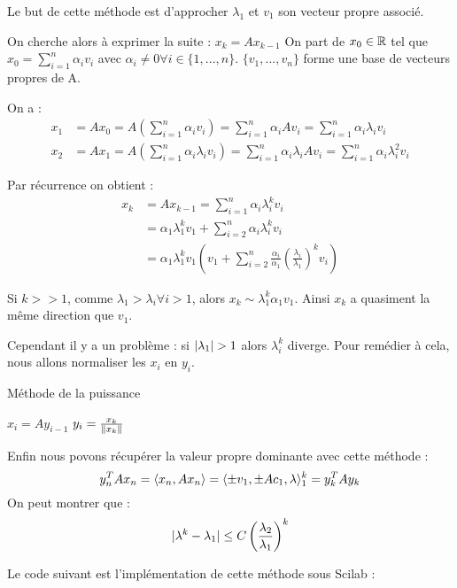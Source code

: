 	Le but de cette méthode est d'approcher $\lambda_1$ et $v_1$ son vecteur propre associé.

	On cherche alors à exprimer la suite : $x_k = Ax_{k-1}$ 
	On part de $x_0 \in \mathbb{R}$ tel que $x_0 = \sum_{i=1}^n \alpha_i v_i$ avec $\alpha_i \neq 0 \forall i \in \{1,...,n\}$. $\{v_1, ..., v_n\}$ forme une base de vecteurs propres de A.

	On a :
	\begin{align*}	
		x_1 &= Ax_0 = A \left( \sum_{i=1}^n \alpha_i v_i \right) = \sum_{i=1}^n \alpha_i Av_i = \sum_{i=1}^n \alpha_i \lambda_i v_i		\\
		x_2 &= Ax_1 = A \left( \sum_{i=1}^n \alpha_i \lambda_i v_i \right) = \sum_{i=1}^n \alpha_i \lambda_i Av_i = \sum_{i=1}^n \alpha_i \lambda_i^2 v_i
	\end{align*}
	
	Par récurrence on obtient :
	\begin{align*}
		x_k &= Ax_{k-1} = \sum_{i=1}^n \alpha_i \lambda_i^k v_i		\\
			&= \alpha_1 \lambda_1^k v_1 + \sum_{i=2}^n \alpha_i \lambda_i^k v_i	\\
			&= \alpha_1 \lambda_1^k v_1 \left( v_1 + \sum_{i=2}^n \frac{\alpha_i}{\alpha_1} \left( \frac{\lambda_i}{\lambda_1} \right)^k v_i  \right)
	\end{align*}

	Si $k>>1$, comme $\lambda_1 > \lambda_i \forall i >1$, alors $x_k \sim \lambda_1^k \alpha_1 v_1$. Ainsi $x_k$ a quasiment la même direction que $v_1$.

	Cependant il y a un problème : si $\lvert \lambda_1 \rvert>1$ alors $\lambda_i^k$ diverge. Pour remédier à cela, nous allons normaliser les $x_i$ en $y_i$.

	\begin{algorithm}[H]
	\DontPrintSemicolon
	\caption{Méthode de la puissance}
		{
			$x_i = Ay_{i-1}$\;
			$y_i = \frac{x_k}{\lVert x_k \rVert}$\;
		}
	\end{algorithm}

	Enfin nous povons récupérer la valeur propre dominante avec cette méthode :
	$$
		y_n^T A x_n = \langle x_n, Ax_n \rangle = \langle \pm v_1, \pm Ac_1, \lambda \rangle_1^k = y_k^T A y_k
	$$
	On peut montrer que :
	$$
		\lvert \lambda^k - \lambda_1 \rvert \leq C \left( \frac{\lambda_2}{\lambda_1} \right)^k
	$$

	Le code suivant est l'implémentation de cette méthode sous Scilab :

